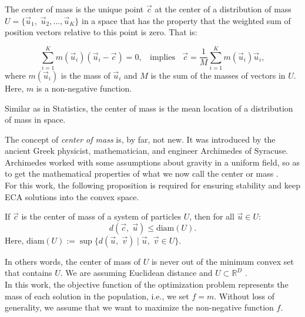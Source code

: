 \documentclass[graybox]{svmult}
\begin{document}
\begin{definition}
	The center of mass is the unique point $\vec{c}$ at the center of a distribution
	of mass $U = \{\vec{u}_1,\; \vec{u}_2 , \ldots , \vec{u}_K \}$ in a space that 
	has the property that the weighted sum of position vectors relative to this point 
	is zero. That is:

	\begin{equation}
		\sum_{i = 1}^K m(\vec{u}_i) (\vec{u}_i - \vec{c}) = 0, \;\; \text{ implies } \;\; 
		\vec{c} = \dfrac{1}{M} \sum_{i = 1}^K  m(\vec{u}_i)  \vec{u}_i,
		\label{eq:masscenter}
	\end{equation}
	where $m(\vec{u}_i)$ is the mass of $\vec{u}_i$ and  $M$ is the sum of the 
	masses of vectors in $U$. Here, $m$ is a non-negative function.
\end{definition}
%
%
\begin{note}
Similar as in Statistics, the center of mass is the mean location of a distribution 
of mass in space.
\end{note}
% 
The concept of \textit{center of mass} is, by far, not new. It was introduced by the ancient 
Greek physicist, mathematician, and engineer Archimedes of Syracuse. Archimedes 
worked with some assumptions about gravity in a uniform field, so as to 
get the mathematical properties of what we now call the center or mass \cite{kleppner73}.\\

For this work, the following proposition is required for ensuring stability and keep ECA 
solutions into the convex space.

\begin{proposition}
	If $\vec{c}$ is the center of mass of a system of particles $U$, 
	then  for all $ \vec{u}\in U $:
	$$  d(\vec{c},\; \vec{u} )  \leq \text{diam}(U). $$
	Here, diam$(U) := \sup\{ d(\vec{u},\; \vec{v} ) \; | \; \vec{u} ,\; \vec{v} \in U \}$.
\end{proposition}
%
\noindent
In others words, the center of mass of $U$ is never out of the minimum convex set that 
contains $U$. We are assuming Euclidean distance and $U \subset \mathbb{R}^D$ \cite{rudin}.\\

%
% 
%

In this work, the objective function of the optimization problem represents 
the mass of each solution in the population,  i.e., we set $f = m$. 
Without loss of generality, we assume that we want to maximize 
the non-negative function $f$.
\end{document}
